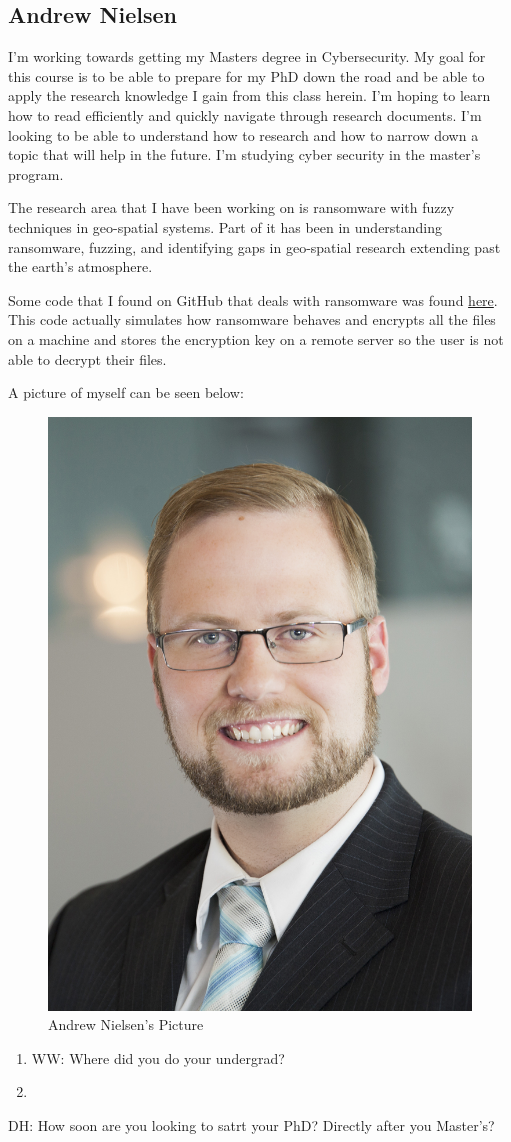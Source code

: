\subsection{Andrew Nielsen}

I'm working towards getting my Masters degree in Cybersecurity. My goal for this course is to be able to prepare for my PhD down the road and be able to apply the research knowledge I gain from this class herein. I'm hoping to learn how to read efficiently and quickly navigate through research documents. I'm looking to be able to understand how to research and how to narrow down a topic that will help in the future. I'm studying cyber security in the master's program. 

The research area that I have been working on is ransomware with fuzzy techniques in geo-spatial systems. Part of it has been in understanding ransomware, fuzzing, and identifying gaps in geo-spatial research extending past the earth's atmosphere.

Some code that I found on GitHub that deals with ransomware was found \href{https://github.com/mauri870/ransomware.git}{here}. This code actually simulates how ransomware behaves and encrypts all the files on a machine and stores the encryption key on a remote server so the user is not able to decrypt their files. 


A picture of myself can be seen below:

\begin{figure}[htp]\centering
\includegraphics[width=.3\textwidth]{Andrew Professional picture.jpg}
\caption{Andrew Nielsen's Picture}
\label{fig:Andrew Professional picture}
\end{figure}

\begin{enumerate}
    \item WW: Where did you do your undergrad?
    \item
\end{enumerate}

DH: How soon are you looking to satrt your PhD? Directly after you Master's? 
